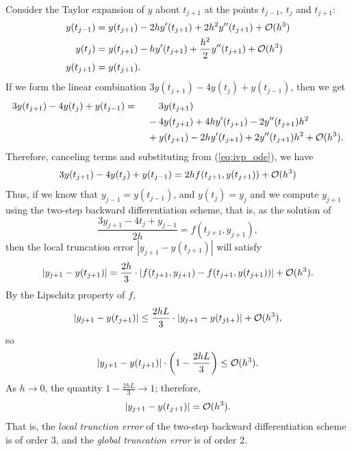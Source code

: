 \documentclass{homework}
\begin{document}
	\question 
	Consider the Taylor expansion of $y$ about $t_{j+1}$ at the points $t_{j-1}$, $t_j$ and $t_{j+1}$:
	\begin{align}
		y(t_{j-1}) &= y(t_{j+1}) - 2hy'(t_{j+1}) + 2h^2y''(t_{j+1}) + \mathcal{O}(h^3) \\
		y(t_j) &= y(t_{j+1}) - hy'(t_{j+1}) + \frac{h^2}{2}y''(t_{j+1}) + \mathcal{O}(h^3) \\
		y(t_{j+1}) &= y(t_{j+1}).
	\end{align}
	If we form the linear combination $3y(t_{j+1}) - 4y(t_j) + y(t_{j-1})$, then we get
	\begin{alignat}{2}
		3y(t_{j+1}) - 4y(t_j) + y(t_{j-1}) &{}={} &&3y(t_{j+1})\\
		&& {}-{} &4y(t_{j+1}) + 4hy'(t_{j+1}) - 2y''(t_{j+1})h^2 \\
		&&{}+{}&y(t_{j+1})-2hy'(t_{j+1}) + 2y''(t_{j+1})h^2 + \mathcal{O}(h^3).
	\end{alignat}
	Therefore, canceling terms and substituting from (\ref{eq:ivp_ode}), we have
	\begin{equation}
		3y(t_{j+1}) - 4y(t_j) + y(t_{j-1}) = 2hf(t_{j+1}, y(t_{j+1})) + \mathcal{O}(h^3)
	\end{equation}
	Thus, if we know that $y_{j-1} = y(t_{j-1})$, and $y(t_j) = y_j$ and we compute $y_{j+1}$ using the two-step backward differentiation scheme, that is, as the solution of
	\begin{equation}
		\label{p2:eq:2_step_backward}
		\frac{3y_{j+1} -4t_j + y_{j-1}}{2h} = f(t_{j+1},y_{j+1}),
	\end{equation}
	then the local truncation error $|y_{j+1} - y(t_{j+1})|$ will satisfy
	\begin{equation}
		|y_{j+1} - y(t_{j+1})| = \frac{2h}{3}\cdot|f(t_{j+1}, y_{j+1}) - f(t_{j+1}, y(t_{j+1}))| + \mathcal{O}(h^3).
	\end{equation}
	By the Lipschitz property of $f$,
	\begin{equation}
		|y_{j+1} - y(t_{j+1})| \le \frac{2hL}{3}\cdot|y_{j+1}-y(t_{j1+})| + \mathcal{O}(h^3),
	\end{equation}
	so
	\begin{equation}
		|y_{j+1} - y(t_{j+1})|\cdot\left(1 - \frac{2hL}{3}\right) \le \mathcal{O}(h^3).
	\end{equation}
	As $h \to 0$, the quantity $1-\frac{2hL}{3} \to 1$; therefore,
	\begin{equation}
		|y_{j+1} - y(t_{j+1})| = \mathcal{O}(h^3).
	\end{equation}
	That is, the \textit{local trunction error} of the two-step backward differentiation scheme is of order 3, and the \textit{global truncation error} is of order 2.
	
\end{document}
